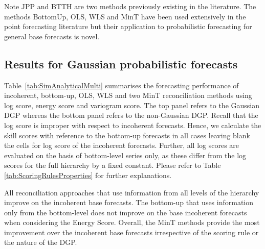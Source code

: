 \documentclass[12pt]{article}
\theoremstyle{definition}
\begin{document}
Note JPP and BTTH are two methods previously existing in the literature. The methods BottomUp, OLS, WLS and MinT have been used extensively in the point forecasting literature but their application to probabilistic forecasting for general base forecasts is novel.

\subsection{Results for Gaussian probabilistic forecasts}\label{sec:SimAnalysticalResults}


Table~\ref{tab:SimAnalyticalMulti} summarises the forecasting performance of incoherent, bottom-up, OLS, WLS and two MinT reconciliation methods using log score, energy score and variogram score. The top panel refers to the Gaussian DGP whereas the bottom panel refers to the non-Gaussian DGP. Recall that the log score is improper with respect to incoherent forecasts. Hence, we calculate the skill scores with reference to the bottom-up forecasts in all cases leaving blank the cells for log score of the incoherent forecasts. Further, all log scores are evaluated on the basis of bottom-level series only, as these differ from the log scores for the full hierarchy by a fixed constant. Please refer to Table \ref{tab:ScoringRulesProperties} for further explanations.

All reconciliation approaches that use information from all levels of the hierarchy improve on the incoherent base forecasts. The bottom-up that uses information only from the bottom-level does not improve on the base incoherent forecasts when considering the Energy Score. Overall, the MinT methods provide the most improvement over the incoherent base forecasts irrespective of the scoring rule or the nature of the DGP.
\end{document}
